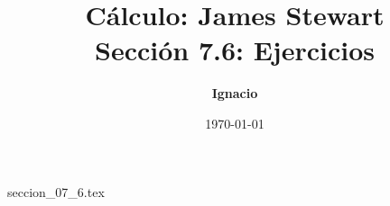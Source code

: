 \documentclass[11pt,spanish,oneside]{report}
\title{\textbf{Cálculo: James Stewart} \\ \Large Sección 7.6: Ejercicios}
\author{\textbf{Ignacio}}
\date{\today}
\begin{document}
\maketitle

{seccion_07_6.tex}
\end{document}

